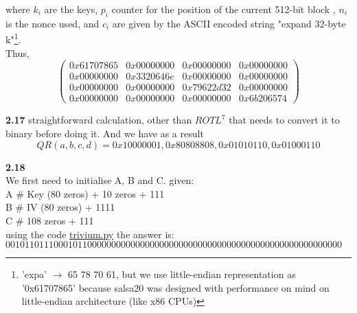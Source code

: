 where $k_i $ are the keys, $p_i$ counter for the position of the current 512-bit block , $n_i$ is the nonce used, and $c_i$ are given by the ASCII encoded string "expand 32-byte k"\footnote{'expa' $\rightarrow$ 65 78 70 61, but we use little-endian representation as '0x61707865' because salsa20 was designed with performance on mind on little-endian architecture (like x86 CPUs)}.\\
Thus,\\
\begin{equation*}
\begin{pmatrix}
    0x61707865  & 0x00000000 & 0x00000000 & 0x00000000 \\
    0x00000000 & 0x3320646e & 0x00000000 & 0x00000000 \\
    0x00000000 & 0x00000000 & 0x79622d32 & 0x00000000 \\
    0x00000000 & 0x00000000 & 0x00000000 & 0x6b206574
\end{pmatrix}
\end{equation*}

\textbf{2.17}
straightforward calculation, other than $ROTL^7$ that needs to convert it to binary before doing it. And we have as a result 
\begin{equation*}
    QR(a,b,c,d)= 0x10000001, 0x80808808, 0x01010110, 0x01000110
\end{equation*}

\textbf{2.18}\\
We first need to initialise A, B and C. given: \\
A \# Key (80 zeros) + 10 zeros + 111\\
B \# IV (80 zeros) + 1111 \\
C \# 108 zeros + 111\\
using the code \href{https://github.com/Ahpatsum15/Understanding-cryptography-solution-handbook-even-numbered/blob/main/chapter-02/trivium.py}{trivium.py} the answer is: \\$0010110111000101100000000000000000000000000000000000000000000000000000$